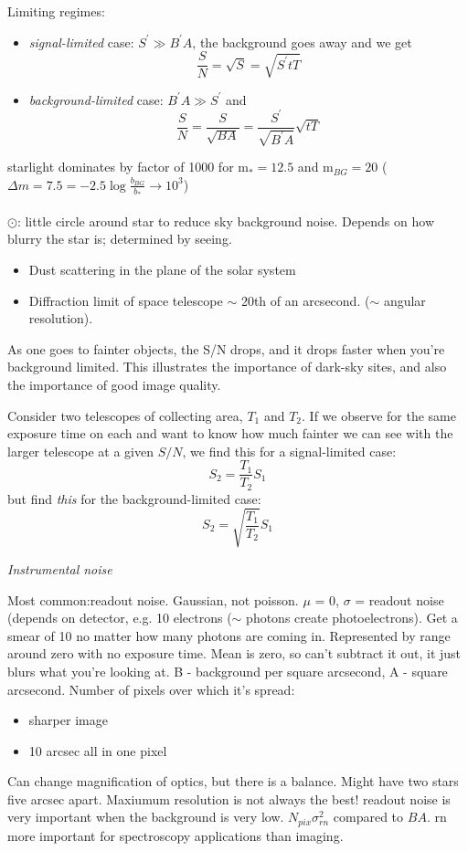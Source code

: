 \documentclass[12pt]{article}
\begin{document}
Limiting regimes:
\begin{itemize}
    \item \emph{signal-limited} case: $S^{\prime}\gg B^{\prime}A$,
        the background goes away and we get
         $$ \frac{S}{N} = \sqrt{S} = \sqrt{S^{\prime}tT} $$
    \item \emph{background-limited} case: $B^{\prime}A\gg S^{\prime}$
        and
        $$ \frac{S}{N} = \frac{S}{\sqrt{BA}} =
        \frac{S^{\prime}}{\sqrt{B^{\prime}A}}\sqrt{tT} $$
\end{itemize}

\textcolor{myBlue}{starlight dominates by factor of 1000 for
m$_* = 12.5$ and m$_{BG} = 20$ ($\Delta m = 7.5
= -2.5\log\frac{b_{BG}}{b_*}
\rightarrow 10^{3}$)\\\\
\large$\odot$: \normalsize little circle around star to reduce sky
background noise. Depends on how blurry the star is; determined by
seeing.
\begin{itemize}
    \item Dust scattering in the plane of the solar system
    \item Diffraction limit of space telescope $\sim$ 20th of an
    arcsecond. ($\sim$ angular resolution).
\end{itemize}
}

As one goes to fainter objects, the S/N drops, and it drops faster
when you're background limited. This illustrates the importance of
dark-sky sites, and also the importance of good image quality.

Consider two telescopes of collecting area, $T_1$ and $T_2$.
If we observe for the same exposure time on each and want to know how
much fainter we can see with the larger telescope at a given $S/N$, we
find this for a signal-limited case:
$$ S_2 = \frac{T_1}{T_2}S_1 $$
but find \emph{this} for the background-limited case:
$$ S_2 = \sqrt{\frac{T_1}{T_2}}S_1  $$


\textcolor{om}{\emph{}}

\emph{Instrumental noise}

\textcolor{myBlue}{Most common:readout noise. Gaussian, not poisson.
$\mu$ = 0, $\sigma$ = readout noise (depends on detector, e.g. 10
electrons ($\sim$ photons create photoelectrons). Get a smear of 10 no
matter how many photons are coming in. Represented by range around
zero with no exposure time. Mean is zero, so can't subtract it out, it
just blurs what you're looking at. B - background per square
arcsecond, A - square arcsecond. Number of pixels over which it's
spread:
\begin{itemize}
    \item sharper image
    \item 10 arcsec all in one pixel
\end{itemize}
Can change magnification of optics, but there is a balance. Might have
two stars five arcsec apart. Maxiumum resolution is not always the
best! readout noise is very important when the background is very low.
$N_{pix}\sigma_{rn}^{2}$ compared to $BA$. rn more important for
spectroscopy applications than imaging.
}
\end{document}
